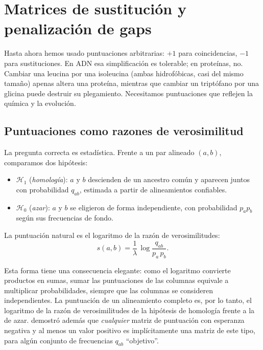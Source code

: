 \section{Matrices de sustitución y penalización de gaps}\label{sec:03-matrices}

Hasta ahora hemos usado puntuaciones arbitrarias: $+1$ para coincidencias, $-1$ para sustituciones. En ADN esa simplificación es tolerable; en proteínas, no. Cambiar una leucina por una isoleucina (ambas hidrofóbicas, casi del mismo tamaño) apenas altera una proteína, mientras que cambiar un triptófano por una glicina puede destruir su plegamiento. Necesitamos puntuaciones que reflejen la química y la evolución.

\subsection{Puntuaciones como razones de verosimilitud}

La pregunta correcta es estadística. Frente a un par alineado $(a,b)$, comparamos dos hipótesis:
\begin{itemize}
  \item $\mathcal{H}_1$ (\emph{homología}): $a$ y $b$ descienden de un ancestro común y aparecen juntos con probabilidad $q_{ab}$, estimada a partir de alineamientos confiables.
  \item $\mathcal{H}_0$ (\emph{azar}): $a$ y $b$ se eligieron de forma independiente, con probabilidad $p_a p_b$ según sus frecuencias de fondo.
\end{itemize}
La puntuación natural es el logaritmo de la razón de verosimilitudes:
\begin{equation}\label{eq:03-logodds}
s(a,b) = \frac{1}{\lambda}\,\log\frac{q_{ab}}{p_a\,p_b}.
\end{equation}

\begin{simbolos}
\end{simbolos}

Esta forma tiene una consecuencia elegante: como el logaritmo convierte productos en sumas, sumar las puntuaciones de las columnas equivale a multiplicar probabilidades, siempre que las columnas se consideren independientes. La puntuación de un alineamiento completo es, por lo tanto, el logaritmo de la razón de verosimilitudes de la hipótesis de homología frente a la de azar. \textcite{c03-altschul1991} demostró además que \emph{cualquier} matriz de puntuación con esperanza negativa y al menos un valor positivo es implícitamente una matriz de este tipo, para algún conjunto de frecuencias $q_{ab}$ ``objetivo''.

